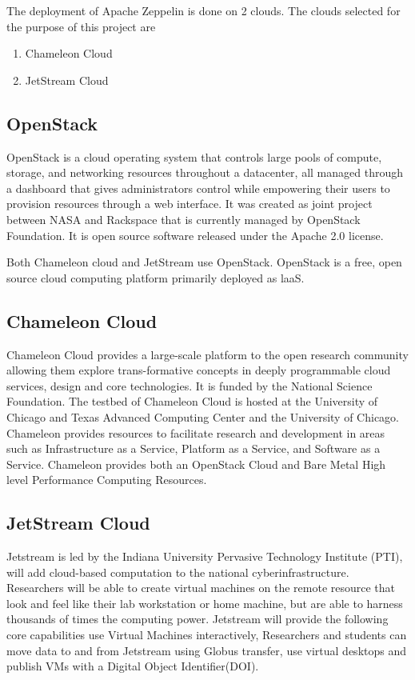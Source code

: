 \documentclass[9pt,twocolumn,twoside]{../../styles/osajnl}
\begin{document}
The deployment of Apache Zeppelin is done on 2 clouds. The clouds 
selected for the purpose of this project are
\begin{enumerate}
	\item Chameleon Cloud
	
	\item JetStream Cloud
\end{enumerate}

\subsection{OpenStack}

OpenStack\cite{www-openstack} is a cloud operating system that 
controls large pools of compute, storage, and networking resources 
throughout a datacenter, all managed through a dashboard that gives 
administrators control while empowering their users to provision 
resources through a web interface. It was created as joint project 
between NASA and Rackspace that is currently managed by OpenStack 
Foundation. It is open source software released under the Apache 2.0 
license.

Both Chameleon cloud and JetStream use OpenStack. OpenStack is a 
free, open source cloud computing platform primarily deployed as 
laaS.\cite{www-laas}

\subsection{Chameleon Cloud}

Chameleon Cloud\cite{www-cc} provides a large-scale platform to the 
open research community allowing them explore trans-formative 
concepts in deeply programmable cloud services, design and core 
technologies. It is funded by the National Science Foundation. The 
testbed of Chameleon Cloud is hosted at the University of Chicago and 
Texas Advanced Computing Center and the University of Chicago. 
Chameleon provides resources to facilitate research and development 
in areas such as Infrastructure as a Service, Platform as a Service, 
and Software as a Service. Chameleon provides both an OpenStack Cloud 
and Bare Metal High level Performance Computing Resources.

\subsection{JetStream Cloud}

Jetstream is led by the Indiana University Pervasive Technology 
Institute (PTI), will add cloud-based computation to the national 
cyberinfrastructure. Researchers will be able to create virtual 
machines on the remote resource that look and feel like their lab 
workstation or home machine, but are able to harness thousands of 
times the computing power. Jetstream will provide the following core 
capabilities use Virtual Machines interactively, Researchers and 
students can move data to and from Jetstream using {Globus 
transfer}\cite{www-gt}, use virtual desktops and publish VMs with a 
Digital Object Identifier(DOI)\cite{www-doi}.
\end{document}
